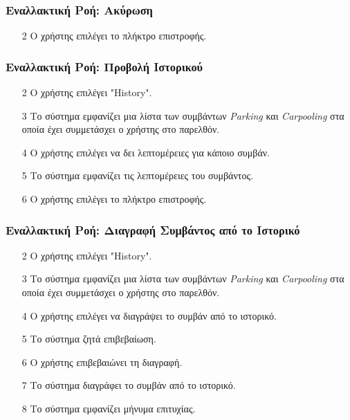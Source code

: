 \subsubsection{Εναλλακτική Ροή: Ακύρωση}

\begin{enumerate}
    \item[2] Ο χρήστης επιλέγει το πλήκτρο επιστροφής.
\end{enumerate}

\subsubsection{Εναλλακτική Ροή: Προβολή Ιστορικού}

\begin{enumerate}
    \item[2] Ο χρήστης επιλέγει "History".
    \item[3] Το σύστημα εμφανίζει μια λίστα των συμβάντων \textit{Parking} και
        \textit{Carpooling} στα οποία έχει συμμετάσχει ο χρήστης στο παρελθόν.
    \item[4] Ο χρήστης επιλέγει να δει λεπτομέρειες για κάποιο συμβάν.
    \item[5] Το σύστημα εμφανίζει τις λεπτομέρειες του συμβάντος.
    \item[6] Ο χρήστης επιλέγει το πλήκτρο επιστροφής.
\end{enumerate}

\subsubsection{Εναλλακτική Ροή: Διαγραφή Συμβάντος από το Ιστορικό}

\begin{enumerate}
    \item[2] Ο χρήστης επιλέγει "History".
    \item[3] Το σύστημα εμφανίζει μια λίστα των συμβάντων \textit{Parking} και
        \textit{Carpooling} στα οποία έχει συμμετάσχει ο χρήστης στο παρελθόν.
    \item[4] Ο χρήστης επιλέγει να διαγράψει το συμβάν από το ιστορικό.
    \item[5] Το σύστημα ζητά επιβεβαίωση.
    \item[6] Ο χρήστης επιβεβαιώνει τη διαγραφή.
    \item[7] Το σύστημα διαγράφει το συμβάν από το ιστορικό.
    \item[8] Το σύστημα εμφανίζει μήνυμα επιτυχίας.
\end{enumerate}

